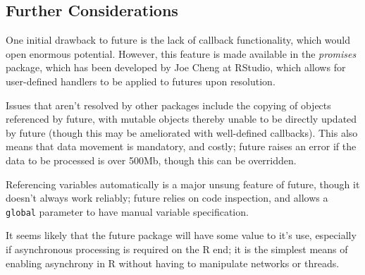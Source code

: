 \hypertarget{sec:further-considerations}{%
    \subsection{Further Considerations}\label{sec:further-considerations}}

One initial drawback to future is the lack of callback functionality,
which would open enormous potential. However, this feature is made
available in the \emph{promises} package, which has been developed by
Joe Cheng at RStudio, which allows for user-defined handlers to be
applied to futures upon resolution\cite{Cheng19}.

Issues that aren't resolved by other packages include the copying of
objects referenced by future, with mutable objects thereby unable to be
directly updated by future (though this may be ameliorated with
well-defined callbacks). This also means that data movement is
mandatory, and costly; future raises an error if the data to be
processed is over 500Mb, though this can be overridden.

Referencing variables automatically is a major unsung feature of future,
though it doesn't always work reliably; future relies on code
inspection, and allows a \texttt{global} parameter to have manual
variable specification.

It seems likely that the future package will have some value to it's
use, especially if asynchronous processing is required on the R end; it
is the simplest means of enabling asynchrony in R without having to
manipulate networks or threads.
